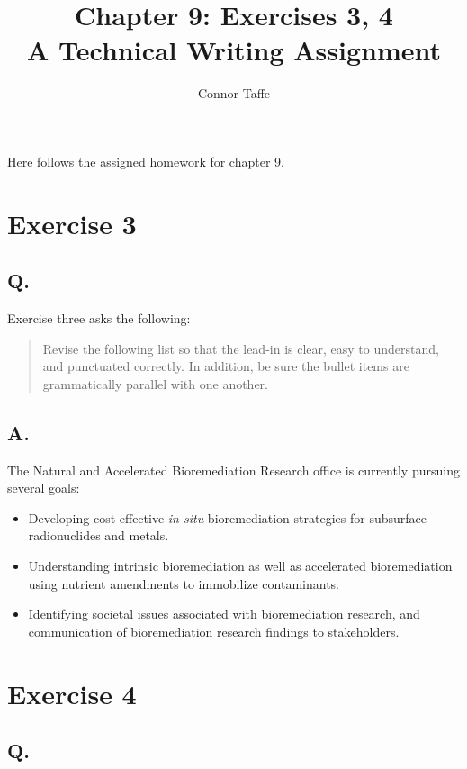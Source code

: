 \documentclass{memoir}
\title{
Chapter 9: Exercises 3, 4
\\\vspace{2mm}
\large
A Technical Writing Assignment
}
\author{Connor Taffe}
\begin{document}
	\maketitle

Here follows the assigned homework for chapter 9.

\section{Exercise 3}

\subsection{Q.}

Exercise three asks the following:

\begin{quote}
	Revise the following list so that the lead-in is clear, easy to understand, and punctuated correctly. In addition, be sure the bullet items are grammatically parallel with one another.
\end{quote}

\subsection{A.}

The Natural and Accelerated Bioremediation Research office is currently pursuing several goals:

\begin{itemize}
	\item{
		Developing cost-effective \emph{in situ} bioremediation strategies for subsurface radionuclides and metals.
	}
	\item{
		Understanding intrinsic bioremediation as well as accelerated bioremediation using nutrient amendments to immobilize contaminants.
	}
	\item{
		Identifying societal issues associated with bioremediation research, and communication of bioremediation research findings to stakeholders.
	}
\end{itemize}

\section{Exercise 4}

\subsection{Q.}
\end{document}
